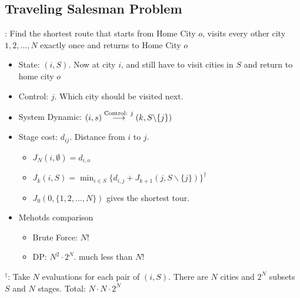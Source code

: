 \subsection{Traveling Salesman Problem}:
Find the shortest route that starts from Home City $o$, visits every other city $1,2,...,N$ exactly once and returns to Home City $o$
\begin{itemize}
    \item State: $(i,S)$. Now at city $i$, and still have to visit cities in $S$ and return to home city $o$
    \item Control: $j$. Which city should be visited next.
    \item System Dynamic: $(i,s)\stackrel{\text{\rm Control: }j}{\longrightarrow} (k,S\backslash \{j\})$
    \item Stage cost: $d_{ij}$. Distance from $i$ to $j$.
    \begin{itemize}
        \item $J_N(i,\emptyset)=d_{i,o}$
        \item $J_k(i,S)=\min_{i\in S} \{ d_{i,j} + J_{k+1}(j,S\backslash \{j\}) \} ^\dagger$
        \item $J_0(0,\{1,2,...,N\})$ gives the shortest tour.
    \end{itemize}
    \item Mehotds comparison
    \begin{itemize}
        \item Brute Force: $N!$
        \item DP: $N^2\cdot 2^N$. much less than $N!$
    \end{itemize}
\end{itemize}
$^\dagger$: Take $N$ evaluations for each pair of $(i,S)$. There are $N$ cities and $2^N$ subsets $S$ and $N$ stages. Total: $N\cdot N \cdot 2^N$

